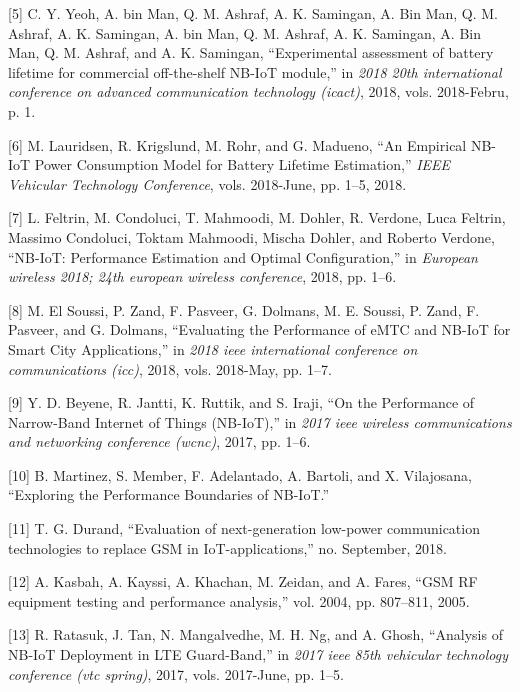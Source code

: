 \documentclass[]{article}
\begin{document}
\leavevmode\hypertarget{ref-Yeoh2018d}{}%
{[}5{]} C. Y. Yeoh, A. bin Man, Q. M. Ashraf, A. K. Samingan, A. Bin
Man, Q. M. Ashraf, A. K. Samingan, A. bin Man, Q. M. Ashraf, A. K.
Samingan, A. Bin Man, Q. M. Ashraf, and A. K. Samingan, ``Experimental
assessment of battery lifetime for commercial off-the-shelf NB-IoT
module,'' in \emph{2018 20th international conference on advanced
communication technology (icact)}, 2018, vols. 2018-Febru, p. 1.

\leavevmode\hypertarget{ref-Lauridsen2018}{}%
{[}6{]} M. Lauridsen, R. Krigslund, M. Rohr, and G. Madueno, ``An
Empirical NB-IoT Power Consumption Model for Battery Lifetime
Estimation,'' \emph{IEEE Vehicular Technology Conference}, vols.
2018-June, pp. 1--5, 2018.

\leavevmode\hypertarget{ref-Feltrin2018}{}%
{[}7{]} L. Feltrin, M. Condoluci, T. Mahmoodi, M. Dohler, R. Verdone,
Luca Feltrin, Massimo Condoluci, Toktam Mahmoodi, Mischa Dohler, and
Roberto Verdone, ``NB-IoT: Performance Estimation and Optimal
Configuration,'' in \emph{European wireless 2018; 24th european wireless
conference}, 2018, pp. 1--6.

\leavevmode\hypertarget{ref-Soussi2018}{}%
{[}8{]} M. El Soussi, P. Zand, F. Pasveer, G. Dolmans, M. E. Soussi, P.
Zand, F. Pasveer, and G. Dolmans, ``Evaluating the Performance of eMTC
and NB-IoT for Smart City Applications,'' in \emph{2018 ieee
international conference on communications (icc)}, 2018, vols. 2018-May,
pp. 1--7.

\leavevmode\hypertarget{ref-Beyene2017b}{}%
{[}9{]} Y. D. Beyene, R. Jantti, K. Ruttik, and S. Iraji, ``On the
Performance of Narrow-Band Internet of Things (NB-IoT),'' in \emph{2017
ieee wireless communications and networking conference (wcnc)}, 2017,
pp. 1--6.

\leavevmode\hypertarget{ref-Martinez2019}{}%
{[}10{]} B. Martinez, S. Member, F. Adelantado, A. Bartoli, and X.
Vilajosana, ``Exploring the Performance Boundaries of NB-IoT.''

\leavevmode\hypertarget{ref-Thomas2018}{}%
{[}11{]} T. G. Durand, ``Evaluation of next-generation low-power
communication technologies to replace GSM in IoT-applications,'' no.
September, 2018.

\leavevmode\hypertarget{ref-Kasbah2005}{}%
{[}12{]} A. Kasbah, A. Kayssi, A. Khachan, M. Zeidan, and A. Fares,
``GSM RF equipment testing and performance analysis,'' vol. 2004, pp.
807--811, 2005.

\leavevmode\hypertarget{ref-Ratasuk2017c}{}%
{[}13{]} R. Ratasuk, J. Tan, N. Mangalvedhe, M. H. Ng, and A. Ghosh,
``Analysis of NB-IoT Deployment in LTE Guard-Band,'' in \emph{2017 ieee
85th vehicular technology conference (vtc spring)}, 2017, vols.
2017-June, pp. 1--5.
\end{document}
